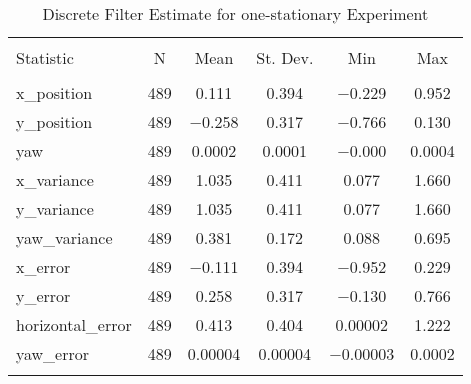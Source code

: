 
\begin{table}[h] \centering 
  \caption{Discrete Filter Estimate for one-stationary Experiment} 
  \label{tab:one_stationary_discrete_summary} 
\begin{tabular}{@{\extracolsep{5pt}}lccccc} 
\\[-1.8ex]\hline 
\hline \\[-1.8ex] 
Statistic & \multicolumn{1}{c}{N} & \multicolumn{1}{c}{Mean} & \multicolumn{1}{c}{St. Dev.} & \multicolumn{1}{c}{Min} & \multicolumn{1}{c}{Max} \\ 
\hline \\[-1.8ex] 
x\_position & 489 & 0.111 & 0.394 & $-$0.229 & 0.952 \\ 
y\_position & 489 & $-$0.258 & 0.317 & $-$0.766 & 0.130 \\ 
yaw & 489 & 0.0002 & 0.0001 & $-$0.000 & 0.0004 \\ 
x\_variance & 489 & 1.035 & 0.411 & 0.077 & 1.660 \\ 
y\_variance & 489 & 1.035 & 0.411 & 0.077 & 1.660 \\ 
yaw\_variance & 489 & 0.381 & 0.172 & 0.088 & 0.695 \\ 
x\_error & 489 & $-$0.111 & 0.394 & $-$0.952 & 0.229 \\ 
y\_error & 489 & 0.258 & 0.317 & $-$0.130 & 0.766 \\ 
horizontal\_error & 489 & 0.413 & 0.404 & 0.00002 & 1.222 \\ 
yaw\_error & 489 & 0.00004 & 0.00004 & $-$0.00003 & 0.0002 \\ 
\hline \\[-1.8ex] 
\end{tabular} 
\end{table} 
